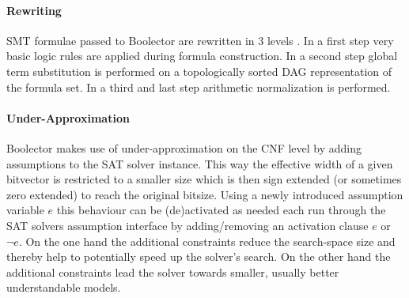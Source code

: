 \paragraph{Rewriting}
SMT formulae passed to Boolector are rewritten in 3 levels \cite{Brummayer-Biere2009_Chapter_BoolectorAnEfficientSMTSolverF}. In a first step very basic logic rules are applied during formula construction. In a second step global term substitution is performed on a topologically sorted DAG representation of the formula set. In a third and last step arithmetic normalization is performed.

\paragraph{Under-Approximation}
Boolector makes use of under-approximation on the CNF level by adding assumptions to the SAT solver instance\cite{Brummayer-PhD}. This way the effective width of a given bitvector is restricted to a smaller size which is then sign extended (or sometimes zero extended) to reach the original bitsize. Using a newly introduced assumption variable $e$ this behaviour can be (de)activated as needed each run through the SAT solvers assumption interface by adding/removing an activation clause $e$ or $\neg e$. On the one hand the additional constraints reduce the search-space size and thereby help to potentially speed up the solver's search. On the other hand the additional constraints lead the solver towards smaller, usually better understandable models.

